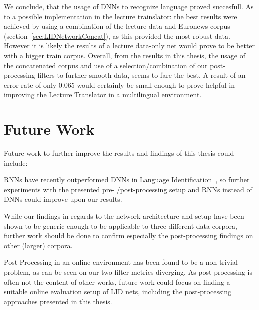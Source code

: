 We conclude, that the usage of DNNs to recognize language proved succesfull. As to a possible implementation in the lecture trainslator: the best results were achieved by using a combination of the lecture data and Euronews corpus (section~\ref{sec:LIDNetworkConcat}), as this provided the most robust data. However it is likely the results of a lecture data-only net would prove to be better with a bigger train corpus. Overall, from the results in this thesis, the usage of the concatenated corpus and use of a selection/combination of our post-processing filters to further smooth data, seems to fare the best. A result of an error rate of only 0.065 would certainly be small enough to prove helpful in improving the Lecture Translator in a multilingual environment.

\section{Future Work}
\label{sec:fw}

Future work to further improve the results and findings of this thesis could include:

RNNs have recently outperformed DNNs in Language Identification~\cite{gonzalez2014automatic}, so further experiments with the presented pre- /post-processing setup and RNNs instead of DNNs could improve upon our results.

While our findings in regards to the network architecture and setup have been shown to be generic enough to be applicable to three different data corpora, further work should be done to confirm especially the post-processing findings on other (larger) corpora.

Post-Processing in an online-environment has been found to be a non-trivial problem, as can be seen on our two filter metrics diverging. As post-processing is often not the content of other works, future work could focus on finding a suitable online evaluation setup of LID nets, including the post-processing approaches presented in this thesis.